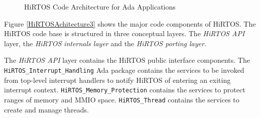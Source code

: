 \documentclass[11pt,letterpaper,twoside,openany]{book}
\begin{document}
\begin{figure}
   \begin{center}
   \end{center}
   \caption{HiRTOS Code Architecture for Ada Applications}
   \label{HiRTOSAchitecture2}
\end{figure}

Figure \ref{HiRTOSAchitecture3} shows the major code components of HiRTOS. The HiRTOS code base is
structured in three conceptual layers. The \emph{HiRTOS API} layer, the \emph{HiRTOS internals layer}
and the \emph{HiRTOS porting layer}.

The \emph{HiRTOS API} layer contains the HiRTOS public interface components.
The \verb'HiRTOS_Interrupt_Handling' Ada package contains the services to be invoked from top-level
interrupt handlers to notify HiRTOS of entering an exiting interrupt context.
\verb'HiRTOS_Memory_Protection' contains the services to protect ranges of memory and MMIO space.
\verb'HiRTOS_Thread' contains the services to create and manage threads.
\end{document}
